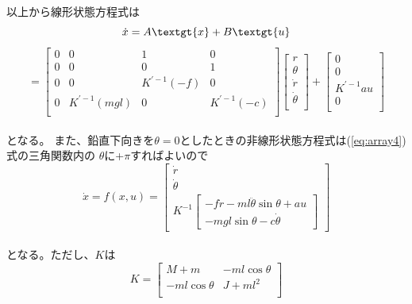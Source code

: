 	\\
	以上から線形状態方程式は\\
	\[\dot{x}=A\textgt{x}+B\textgt{u}\]
	\begin{equation}
		=\left[
		\begin{array}{cccc}
			0 & 0 & 1 & 0 \\
			0 & 0 & 0 & 1 \\
			0 & 0 & K^{'-1}(-f) & 0 \\
			0 & K^{'-1}(mgl) & 0 & K^{'-1}(-c)\\
		\end{array}
		\right]
		\left[
		\begin{array}{c}
			r\\
			\theta\\
			\dot{r}\\
			\dot{\theta}\\
		\end{array}
		\right] + 
		\left[
		\begin{array}{c}
			0\\
			0\\
			K^{'-1}au\\
			0\\
		\end{array}
		\right]
		\label{eq:InPeAboveLiner}
	\end{equation}
	\\
	となる。
	また、鉛直下向きを$\theta = 0$としたときの非線形状態方程式は(\ref{eq:array4})式の三角関数内の
	$\theta$に+$\pi$すればよいので
	\begin{equation}
		\dot{x} = f(x,u)=\left[
		\begin{array}{ccc}
			\dot{r}\\
			\dot{\theta}\\
			K^{-1}\left[
			\begin{array}{ccc}
				-f\dot{r}-ml\ddot{\theta}\sin{\theta}+au\\
				-mgl\sin{\theta}-c\dot{\theta}
			\end{array}
			\right]
		\end{array}
		\right]
		\label{eq:InPeUnderNonLiner}
	\end{equation}
	\\
	となる。ただし、$K$は
	\begin{equation}
		K=\left[
		\begin{array}{ccc}
			M+m & -ml\cos{\theta}\\
			-ml\cos{\theta} & J+ml^{2}\\
		\end{array}
		\right]
		\label{eq:InPeUnderNonLinerK}
	\end{equation}
